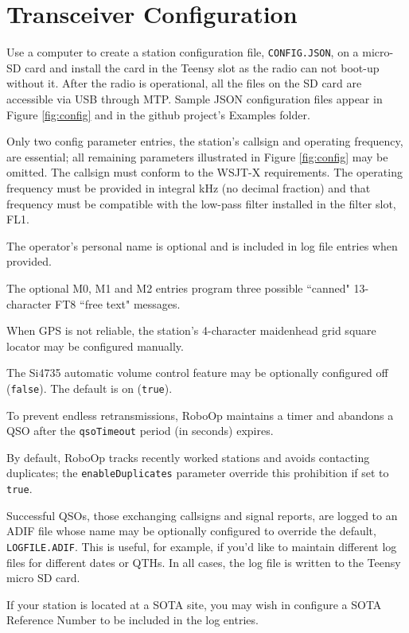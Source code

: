 \documentclass[10pt, letterpaper,]{article}
\begin{document}
\section*{Transceiver Configuration}
Use a computer to create a station configuration file, \texttt{CONFIG.JSON}, on a micro-SD card and install the card in the Teensy slot as the radio can not boot-up without it.
After the radio is operational, all the files on the SD card are accessible via USB through MTP.
Sample JSON configuration files appear in Figure \ref{fig:config} and in the github project's Examples folder.

Only two config parameter entries, the station's callsign and operating frequency, are essential; all remaining parameters illustrated in Figure \ref{fig:config} may be omitted.
The callsign must conform to the WSJT-X requirements.
The operating frequency must be provided in integral kHz (no decimal fraction) and that frequency must be compatible with the low-pass filter installed in the filter slot, FL1.

The operator's personal name is optional and is included in log file entries when provided.

The optional M0, M1 and M2 entries program three possible ``canned" 13-character FT8 ``free text" messages.

When GPS is not reliable, the station's 4-character maidenhead grid square locator may be configured manually.

The Si4735 automatic volume control feature may be optionally configured off (\texttt{false}). 
The default is on (\texttt{true}).

To prevent endless retransmissions, RoboOp maintains a timer and abandons a QSO after the \texttt{qsoTimeout} period (in seconds) expires.

By default, RoboOp tracks recently worked stations and avoids contacting duplicates; the \texttt{enableDuplicates} parameter override this prohibition if set to \texttt{true}.

Successful QSOs, those exchanging callsigns and signal reports, are logged to an ADIF file whose name may be optionally configured to override the default, \texttt{LOGFILE.ADIF}.
This is useful, for example, if you'd like to maintain different log files for different dates or QTHs.
In all cases, the log file is written to the Teensy micro SD card.

If your station is located at a SOTA site, you may wish in configure a SOTA Reference Number to be included in the log entries.
\end{document}
